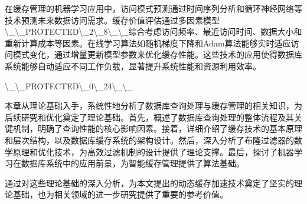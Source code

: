 在缓存管理的机器学习应用中，访问模式预测通过时间序列分析和循环神经网络等技术预测未来数据访问需求。缓存价值评估通过多因素模型\textbackslash{}_\textbackslash{}_PROTECTED\textbackslash{}_2\textbackslash{}_8\textbackslash{}_\textbackslash{}_综合考虑访问频率、最近访问时间、数据大小和重新计算成本等因素。在线学习算法如随机梯度下降和Adam算法能够实时适应访问模式变化，通过增量更新模型参数来优化缓存性能。这些技术的应用使得数据库系统能够自动适应不同工作负载，显著提升系统性能和资源利用效率。

\textbackslash{}_\textbackslash{}_PROTECTED\textbackslash{}_0\textbackslash{}_24\textbackslash{}_\textbackslash{}_

本章从理论基础入手，系统性地分析了数据库查询处理与缓存管理的相关知识，为后续研究和优化奠定了理论基础。首先，概述了数据库查询处理的整体流程及其关键机制，明确了查询性能的核心影响因素。接着，详细介绍了缓存技术的基本原理和层次结构，以及数据库缓存系统的架构设计。然后，深入分析了布隆过滤器的数学原理和优化技术，为高效过滤机制的设计提供了理论支撑。最后，探讨了机器学习在数据库系统中的应用前景，为智能缓存管理提供了算法基础。

通过对这些理论基础的深入分析，为本文提出的动态缓存加速技术奠定了坚实的理论基础，也为相关领域的进一步研究提供了重要的参考价值。